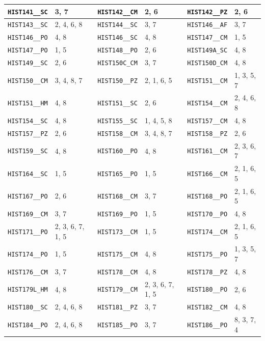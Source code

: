 \begin{longtable}{|l|l||l|l||l|l|}
    \verb|HIST141__SC| & 3, 7 & \verb|HIST142__CM| & 2, 6 & \verb|HIST142__PZ| & 2, 6\\\hline
    \verb|HIST143__SC| & 2, 4, 6, 8 & \verb|HIST144__SC| & 3, 7 & \verb|HIST146__AF| & 3, 7\\\hline
    \verb|HIST146__PO| & 4, 8 & \verb|HIST146__SC| & 4, 8 & \verb|HIST147__CM| & 1, 5\\\hline
    \verb|HIST147__PO| & 1, 5 & \verb|HIST148__PO| & 2, 6 & \verb|HIST149A_SC| & 4, 8\\\hline
    \verb|HIST149__SC| & 2, 6 & \verb|HIST150C_CM| & 3, 7 & \verb|HIST150D_CM| & 4, 8\\\hline
    \verb|HIST150__CM| & 3, 4, 8, 7 & \verb|HIST150__PZ| & 2, 1, 6, 5 & \verb|HIST151__CM| & 1, 3, 5, 7\\\hline
    \verb|HIST151__HM| & 4, 8 & \verb|HIST151__SC| & 2, 6 & \verb|HIST154__CM| & 2, 4, 6, 8\\\hline
    \verb|HIST154__SC| & 4, 8 & \verb|HIST155__SC| & 1, 4, 5, 8 & \verb|HIST157__CM| & 4, 8\\\hline
    \verb|HIST157__PZ| & 2, 6 & \verb|HIST158__CM| & 3, 4, 8, 7 & \verb|HIST158__PZ| & 2, 6\\\hline
    \verb|HIST159__SC| & 4, 8 & \verb|HIST160__PO| & 4, 8 & \verb|HIST161__CM| & 2, 3, 6, 7\\\hline
    \verb|HIST164__SC| & 1, 5 & \verb|HIST165__PO| & 1, 5 & \verb|HIST166__CM| & 2, 1, 6, 5\\\hline
    \verb|HIST167__PO| & 2, 6 & \verb|HIST168__CM| & 3, 7 & \verb|HIST168__PO| & 2, 1, 6, 5\\\hline
    \verb|HIST169__CM| & 3, 7 & \verb|HIST169__PO| & 1, 5 & \verb|HIST170__PO| & 4, 8\\\hline
    \verb|HIST171__PO| & 2, 3, 6, 7, 1, 5 & \verb|HIST173__CM| & 1, 5 & \verb|HIST174__CM| & 2, 1, 6, 5\\\hline
    \verb|HIST174__PO| & 1, 5 & \verb|HIST175__CM| & 4, 8 & \verb|HIST175__PO| & 1, 3, 5, 7\\\hline
    \verb|HIST176__CM| & 3, 7 & \verb|HIST178__CM| & 4, 8 & \verb|HIST178__PZ| & 4, 8\\\hline
    \verb|HIST179L_HM| & 4, 8 & \verb|HIST179__CM| & 2, 3, 6, 7, 1, 5 & \verb|HIST180__PO| & 2, 6\\\hline
    \verb|HIST180__SC| & 2, 4, 6, 8 & \verb|HIST181__PZ| & 3, 7 & \verb|HIST182__CM| & 4, 8\\\hline
    \verb|HIST184__PO| & 2, 4, 6, 8 & \verb|HIST185__PO| & 3, 7 & \verb|HIST186__PO| & 8, 3, 7, 4\\\hline

\end{longtable}
